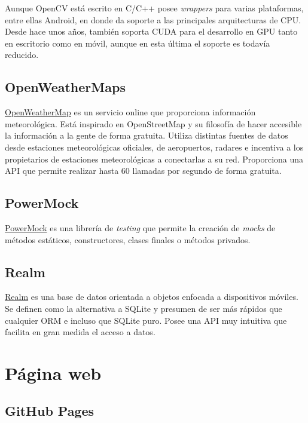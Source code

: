 Aunque OpenCV está escrito en C/C++ posee \emph{wrappers} para varias
plataformas, entre ellas Android, en donde da soporte a las principales
arquitecturas de CPU. Desde hace unos años, también soporta CUDA para el
desarrollo en GPU tanto en escritorio como en móvil, aunque en esta
última el soporte es todavía reducido.

\subsection{OpenWeatherMaps}\label{openweathermaps}

\href{http://openweathermap.org/}{OpenWeatherMap} es un servicio online
que proporciona información meteorológica. Está inspirado en
OpenStreetMap y su filosofía de hacer accesible la información a la
gente de forma gratuita. Utiliza distintas fuentes de datos desde
estaciones meteorológicas oficiales, de aeropuertos, radares e incentiva
a los propietarios de estaciones meteorológicas a conectarlas a su red.
Proporciona una API que permite realizar hasta 60 llamadas por segundo
de forma gratuita.

\subsection{PowerMock}\label{powermock}

\href{https://github.com/powermock/powermock}{PowerMock} es una librería
de \emph{testing} que permite la creación de \emph{mocks} de métodos
estáticos, constructores, clases finales o métodos privados.

\subsection{Realm}\label{realm}

\href{https://realm.io/products/realm-mobile-database/}{Realm} es una
base de datos orientada a objetos enfocada a dispositivos móviles. Se
definen como la alternativa a SQLite y presumen de ser más rápidos que
cualquier ORM e incluso que SQLite puro. Posee una API muy intuitiva que
facilita en gran medida el acceso a datos.

\newpage
\section{Página web}\label{pagina-web}

\subsection{GitHub Pages}\label{github-pages}

